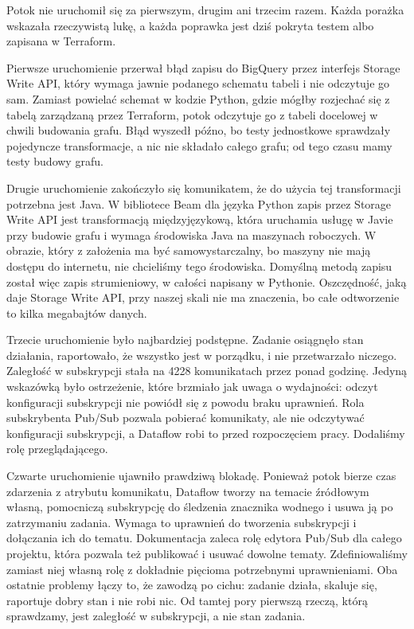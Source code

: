 Potok nie uruchomił się za pierwszym, drugim ani trzecim razem.
Każda porażka wskazała rzeczywistą lukę, a każda poprawka jest dziś pokryta testem albo zapisana w Terraform.

Pierwsze uruchomienie przerwał błąd zapisu do BigQuery przez interfejs Storage Write API, który wymaga jawnie podanego schematu tabeli i nie odczytuje go sam.
Zamiast powielać schemat w kodzie Python, gdzie mógłby rozjechać się z tabelą zarządzaną przez Terraform, potok odczytuje go z tabeli docelowej w chwili budowania grafu.
Błąd wyszedł późno, bo testy jednostkowe sprawdzały pojedyncze transformacje, a nic nie składało całego grafu; od tego czasu mamy testy budowy grafu.

Drugie uruchomienie zakończyło się komunikatem, że do użycia tej transformacji potrzebna jest Java.
W bibliotece Beam dla języka Python zapis przez Storage Write API jest transformacją międzyjęzykową, która uruchamia usługę w Javie przy budowie grafu i wymaga środowiska Java na maszynach roboczych.
W obrazie, który z założenia ma być samowystarczalny, bo maszyny nie mają dostępu do internetu, nie chcieliśmy tego środowiska.
Domyślną metodą zapisu został więc zapis strumieniowy, w całości napisany w Pythonie.
Oszczędność, jaką daje Storage Write API, przy naszej skali nie ma znaczenia, bo całe odtworzenie to kilka megabajtów danych.

Trzecie uruchomienie było najbardziej podstępne.
Zadanie osiągnęło stan działania, raportowało, że wszystko jest w porządku, i nie przetwarzało niczego.
Zaległość w subskrypcji stała na \num{4228} komunikatach przez ponad godzinę.
Jedyną wskazówką było ostrzeżenie, które brzmiało jak uwaga o wydajności: odczyt konfiguracji subskrypcji nie powiódł się z powodu braku uprawnień.
Rola subskrybenta Pub/Sub pozwala pobierać komunikaty, ale nie odczytywać konfiguracji subskrypcji, a Dataflow robi to przed rozpoczęciem pracy.
Dodaliśmy rolę przeglądającego.

Czwarte uruchomienie ujawniło prawdziwą blokadę.
Ponieważ potok bierze czas zdarzenia z atrybutu komunikatu, Dataflow tworzy na temacie źródłowym własną, pomocniczą subskrypcję do śledzenia znacznika wodnego i usuwa ją po zatrzymaniu zadania.
Wymaga to uprawnień do tworzenia subskrypcji i dołączania ich do tematu.
Dokumentacja zaleca rolę edytora Pub/Sub dla całego projektu, która pozwala też publikować i usuwać dowolne tematy.
Zdefiniowaliśmy zamiast niej własną rolę z dokładnie pięcioma potrzebnymi uprawnieniami.
Oba ostatnie problemy łączy to, że zawodzą po cichu: zadanie działa, skaluje się, raportuje dobry stan i nie robi nic.
Od tamtej pory pierwszą rzeczą, którą sprawdzamy, jest zaległość w subskrypcji, a nie stan zadania.

